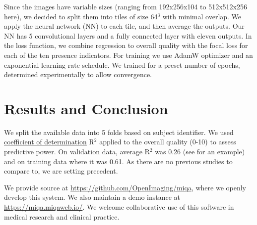 \documentclass{midl} %
\begin{document}
Since the images have variable sizes (ranging from 192x256x104 to 512x512x256 here), we decided to split them into tiles of size 64$^3$ with minimal overlap. We apply the neural network (NN) to each tile, and then average the outputs. Our NN has 5 convolutional layers and a fully connected layer with eleven outputs. In the loss function, we combine regression to overall quality with the focal loss for each of the ten presence indicators. For training we use AdamW optimizer and an exponential learning rate schedule. We trained for a preset number of epochs, determined experimentally to allow convergence.


\section{Results and Conclusion}

We split the available data into 5 folds based on subject identifier. We used \href{https://en.wikipedia.org/wiki/Coefficient_of_determination}{coefficient of determination} R$^2$ applied to the overall quality (0-10) to assess predictive power. On validation data, average R$^2$ was 0.26 (see  for an example) and on training data where it was 0.61. As there are no previous studies to compare to, we are setting precedent.

We provide source at \url{https://github.com/OpenImaging/miqa}, where we openly develop this system. We also maintain a demo instance at \url{https://miqa.miqaweb.io/}.
We welcome collaborative use of this software in medical research and clinical practice.



\end{document}
